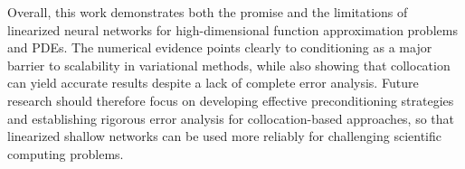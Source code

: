 \documentclass{article}
\theoremstyle{remark}
\begin{document}
Overall, this work demonstrates both the promise and the limitations of linearized neural networks for high-dimensional function approximation problems and PDEs. 
The numerical evidence points clearly to conditioning as a major barrier to scalability in variational methods, while also showing that collocation can yield accurate results despite a lack of complete error analysis. 
Future research should therefore focus on developing effective preconditioning strategies and establishing rigorous error analysis for collocation-based approaches, so that linearized shallow networks can be used more reliably for challenging 
scientific computing problems.

\end{document}
